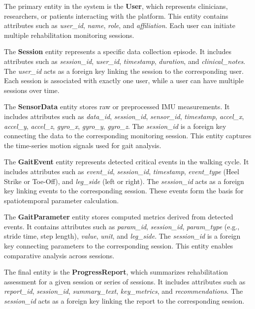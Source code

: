 \documentclass[12pt,a4paper]{report}
\begin{document}
The primary entity in the system is the \textbf{User}, which represents clinicians, researchers, or patients interacting with the platform. This entity contains attributes such as \textit{user\_id}, \textit{name}, \textit{role}, and \textit{affiliation}. Each user can initiate multiple rehabilitation monitoring sessions.

The \textbf{Session} entity represents a specific data collection episode. It includes attributes such as \textit{session\_id}, \textit{user\_id}, \textit{timestamp}, \textit{duration}, and \textit{clinical\_notes}. The \textit{user\_id} acts as a foreign key linking the session to the corresponding user. Each session is associated with exactly one user, while a user can have multiple sessions over time.

The \textbf{SensorData} entity stores raw or preprocessed IMU measurements. It includes attributes such as \textit{data\_id}, \textit{session\_id}, \textit{sensor\_id}, \textit{timestamp}, \textit{accel\_x}, \textit{accel\_y}, \textit{accel\_z}, \textit{gyro\_x}, \textit{gyro\_y}, \textit{gyro\_z}. The \textit{session\_id} is a foreign key connecting the data to the corresponding monitoring session. This entity captures the time-series motion signals used for gait analysis.

The \textbf{GaitEvent} entity represents detected critical events in the walking cycle. It includes attributes such as \textit{event\_id}, \textit{session\_id}, \textit{timestamp}, \textit{event\_type} (Heel Strike or Toe-Off), and \textit{leg\_side} (left or right). The \textit{session\_id} acts as a foreign key linking events to the corresponding session. These events form the basis for spatiotemporal parameter calculation.

The \textbf{GaitParameter} entity stores computed metrics derived from detected events. It contains attributes such as \textit{param\_id}, \textit{session\_id}, \textit{param\_type} (e.g., stride time, step length), \textit{value}, \textit{unit}, and \textit{leg\_side}. The \textit{session\_id} is a foreign key connecting parameters to the corresponding session. This entity enables comparative analysis across sessions.

The final entity is the \textbf{ProgressReport}, which summarizes rehabilitation assessment for a given session or series of sessions. It includes attributes such as \textit{report\_id}, \textit{session\_id}, \textit{summary\_text}, \textit{key\_metrics}, and \textit{recommendations}. The \textit{session\_id} acts as a foreign key linking the report to the corresponding session.
\end{document}
